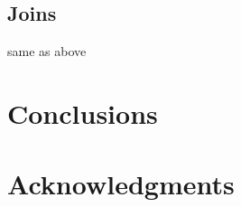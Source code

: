 \documentclass{vldb}
\begin{document}
\subsection{Joins}
same as above
\section{Conclusions}

\balance

\section{Acknowledgments}





\end{document}

